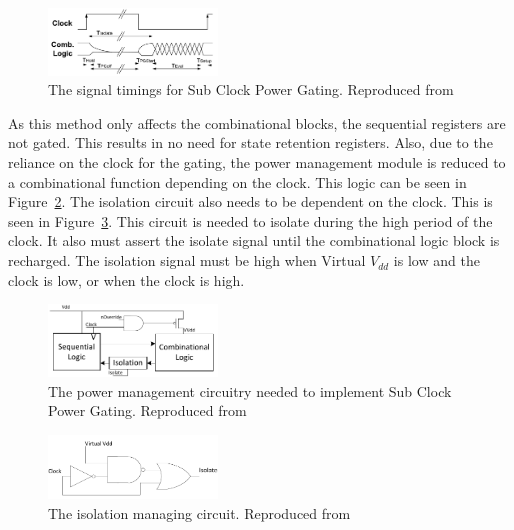 \begin{figure}
\includegraphics[width=0.4\textwidth]{Figures/scpg_timings.png}
\caption{The signal timings for Sub Clock Power Gating. Reproduced from \cite{mistry2011sub}}
\label{fig:scpg:timing}
\end{figure}


As this method only affects the combinational blocks, the sequential registers are not gated.
This results in no need for state retention registers.
Also, due to the reliance on the clock for the gating, the power management module is reduced to a combinational function depending on the clock. 
This logic can be seen in Figure~\ref{fig:scpg:gate}. 
The isolation circuit also needs to be dependent on the clock.
This is seen in Figure~\ref{fig:scpg:iso}.
This circuit is needed to isolate during the high period of the clock. 
It also must assert the isolate signal until the combinational logic block is recharged. 
The isolation signal must be high when Virtual $V_{dd}$ is low and the clock is low, or when the clock is high. 

\begin{figure}
\includegraphics[width=0.4\textwidth]{Figures/mistry_gating.pdf}%
\caption{The power management circuitry needed to implement Sub Clock Power Gating. Reproduced from \cite{mistry2011sub}}
\label{fig:scpg:gate}
\end{figure}
\begin{figure}
\includegraphics[width=0.4\textwidth]{Figures/mistry_isolation.pdf}%
\caption{The isolation managing circuit. Reproduced from \cite{mistry2011sub}}
\label{fig:scpg:iso}
\end{figure}

